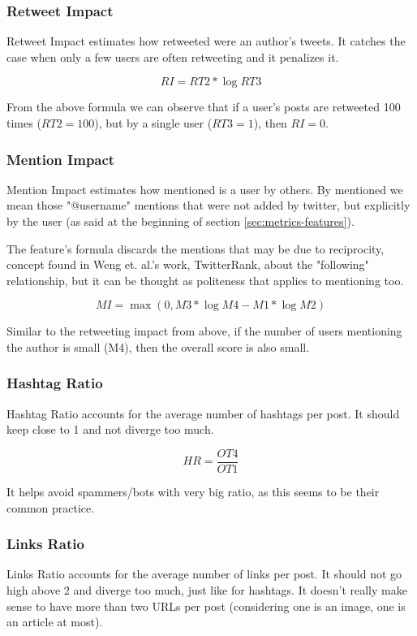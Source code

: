 \subsubsection{Retweet Impact}

Retweet Impact estimates how retweeted were an author's tweets. It catches the case when only a few users are often retweeting and it penalizes it.

$$RI = RT2 * \log{RT3}$$

From the above formula we can observe that if a user's posts are retweeted 100 times ($RT2 = 100$), but by a single user ($RT3 = 1$), then $RI = 0$.

\subsubsection{Mention Impact}

Mention Impact estimates how mentioned is a user by others. By mentioned we mean those "@username" mentions that were not added by twitter, but explicitly by the user (as said at the beginning of section \ref{sec:metrics-features}).

The feature's formula discards the mentions that may be due to reciprocity, concept found in Weng et. al.'s work, TwitterRank\cite{twitterrank}, about the "following" relationship, but it can be thought as politeness that applies to mentioning too.

$$MI = \max{(0, M3 * \log M4 - M1 * \log M2)}$$

Similar to the retweeting impact from above, if the number of users mentioning the author is small (M4), then the overall score is also small.

\subsubsection{Hashtag Ratio}

Hashtag Ratio accounts for the average number of hashtags per post. It should keep close to 1 and not diverge too much.

$$HR = \frac{OT4}{OT1}$$

It helps avoid spammers/bots with very big ratio, as this seems to be their common practice.

\subsubsection{Links Ratio}

Links Ratio accounts for the average number of links per post. It should not go high above 2 and diverge too much, just like for hashtags. It doesn't really make sense to have more than two URLs per post (considering one is an image, one is an article at most).

